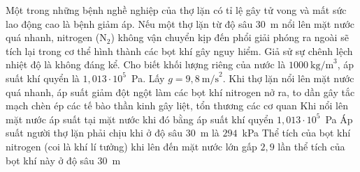 	\begin{ex}%
		Một trong những bệnh nghề nghiệp của thợ lặn có tỉ lệ gây tử vong và mất sức lao động cao là bệnh giảm áp. Nếu một thợ lặn từ độ sâu $30$~m nổi lên mặt nước quá nhanh, nitrogen (N$_2$) không vận chuyển kịp đến phổi giải phóng ra ngoài sẽ tích lại trong cơ thể hình thành các bọt khí gây nguy hiểm. Giả sử sự chênh lệch nhiệt độ là không đáng kể. Cho biết khối lượng riêng của nước là $1000~\text{kg/m}^3$, áp suất khí quyển là $1{,}013\cdot 10^5$~Pa. Lấy $g=9{,}8~\text{m/s}^2$.
		\choiceTFt
		{\True Khi thợ lặn nổi lên mặt nước quá nhanh, áp suất giảm đột ngột làm các bọt khí nitrogen nở ra, to dần gây tắc mạch chèn ép các tế bào thần kinh gây liệt, tổn thương các cơ quan}
		{\True Khi nổi lên mặt nước áp suất tại mặt nước khi đó bằng áp suất khí quyển $1{,}013\cdot 10^5$~Pa}
		{Áp suất người thợ lặn phải chịu khi ở độ sâu $30$~m là $294$~kPa}
		{Thể tích của bọt khí nitrogen (coi là khí lí tưởng) khi lên đến mặt nước lớn gấp $2{,}9$ lần thể tích của bọt khí này ở độ sâu $30$~m}
	\end{ex}

